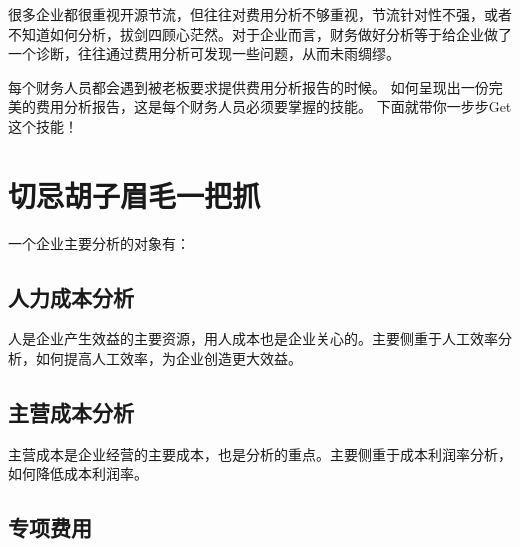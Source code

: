 \documentclass[linespread=1.5,a4paper]{ctexart}
\title{%
\vspace{-4ex}
\zihao{2}\heiti{成本费用分析报告编制方法}%
\vspace{-4ex}
}
\author{}
\date{}
\begin{document}
\maketitle
\pagestyle{plain}
{}
很多企业都很重视开源节流，但往往对费用分析不够重视，节流针对性不强，或者不知道如何分析，拔剑四顾心茫然。对于企业而言，财务做好分析等于给企业做了一个诊断，往往通过费用分析可发现一些问题，从而未雨绸缪。

每个财务人员都会遇到被老板要求提供费用分析报告的时候。
如何呈现出一份完美的费用分析报告，这是每个财务人员必须要掌握的技能。
下面就带你一步步Get这个技能！


\section{切忌胡子眉毛一把抓}
一个企业主要分析的对象有：

\subsection{人力成本分析}

人是企业产生效益的主要资源，用人成本也是企业关心的。主要侧重于人工效率分析，如何提高人工效率，为企业创造更大效益。

\subsection{主营成本分析}

主营成本是企业经营的主要成本，也是分析的重点。主要侧重于成本利润率分析，如何降低成本利润率。

\subsection{专项费用}
\end{document}
